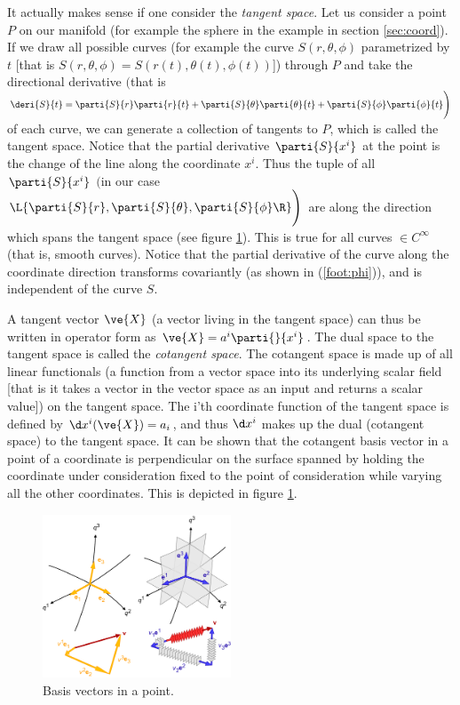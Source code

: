 \documentclass[a4paper, 12pt]{article}
\begin{document}
It actually makes sense if one consider the \emph{tangent space}. Let us 
consider a point $P$ on our manifold (for example the sphere in the example in 
section \ref{sec:coord}). If we draw all possible curves (for example 
the curve $S(r,\theta,\phi)$ parametrized by $t$ [that is 
$S(r,\theta,\phi) = S(r(t),\theta(t),\phi(t))$]) through $P$ and take the 
directional 
derivative $\Bigg($that is $\deri{S}{t} = \parti{S}{r}\parti{r}{t} + 
\parti{S}{\theta}\parti{\theta}{t} + \parti{S}{\phi}\parti{\phi}{t}\Bigg)$ of 
each curve, we can generate a collection of tangents to $P$, which is called 
the tangent space. Notice that the partial derivative $\parti{S}{x^i}$ at 
the point is the change of the line along the coordinate $x^i$. Thus the tuple 
of all $\parti{S}{x^i}$ $\Bigg($in our case $\L\{\parti{S}{r}, 
\parti{S}{\theta}, \parti{S}{\phi}\R\} \Bigg)$ are along the direction 
which spans the tangent space (see figure \ref{fig:basis}). This is true for all 
curves $\in C^{\infty}$ (that is, smooth curves). Notice that the partial 
derivative of the curve along the coordinate direction transforms covariantly 
(as shown in (\ref{foot:phi})), and is independent of the curve $S$.

A tangent vector $\ve{X}$ (a vector living in the tangent space) can thus be 
written in operator form as $\ve{X}=a^i\parti{}{x^{i}}$. The dual space to 
the tangent space is called the \emph{cotangent space}. The cotangent space is 
made up of all linear functionals (a function from a vector space into its 
underlying scalar field [that is it takes a vector in the vector space as an 
input and returns a scalar value]) on the tangent space. The i'th coordinate 
function of the tangent space is defined by $\d x^i(\ve{X}) = a_i$, and thus $\d 
x^i$ makes up the dual (cotangent space) to the tangent space. It can be shown 
that the cotangent basis vector in a point of a coordinate is perpendicular on 
the surface spanned by holding the coordinate under consideration fixed to the 
point of consideration while varying all the other coordinates. This is 
depicted 
in figure \ref{fig:basis}.
%
\begin{figure}[h!]
\center
 \includegraphics[width=0.5\textwidth]{figures/co-contra}
 \caption{Basis vectors in a point.}
 \label{fig:basis}
\end{figure}
\end{document}

